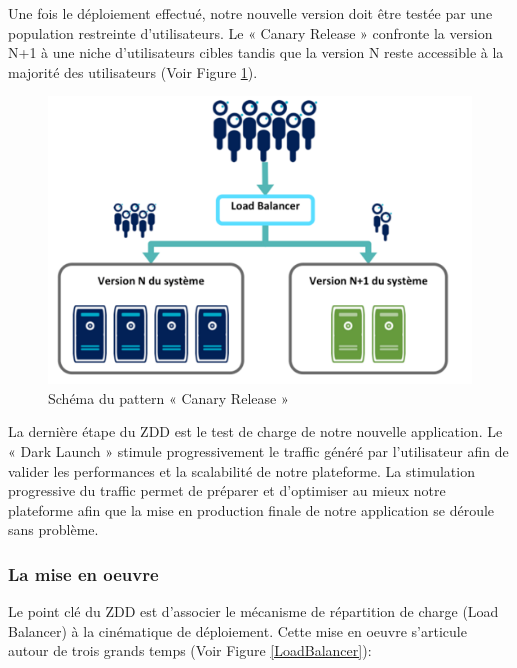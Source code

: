         Une fois le déploiement effectué, notre nouvelle version doit être testée par une population restreinte d’utilisateurs. Le « Canary Release » confronte la version N+1 à une niche d’utilisateurs cibles tandis que la version N reste accessible à la majorité des utilisateurs (Voir Figure \ref{CanaryRelease}).\\

        \begin{figure}
          \begin{center}
            \includegraphics[scale=0.6]{images/CanaryRelease.png}
          \end{center}
          \caption{Schéma du pattern « Canary Release »}
          \label{CanaryRelease}
        \end{figure}

        La dernière étape du ZDD est le test de charge de notre nouvelle application. Le « Dark Launch » stimule progressivement le traffic généré par l’utilisateur afin de valider les performances et la scalabilité de notre plateforme. La stimulation progressive du traffic permet de préparer et d’optimiser au mieux notre plateforme afin que la mise en production finale de notre application se déroule sans problème.

        \subsubsection{La mise en oeuvre}
        Le point clé du ZDD est d'associer le mécanisme de répartition de charge (Load Balancer) à la cinématique de déploiement. Cette mise en oeuvre s'articule autour de trois grands temps (Voir Figure \ref{LoadBalancer}):\\

